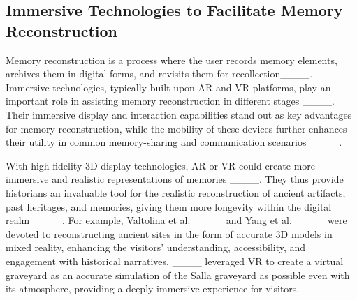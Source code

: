 








\subsection{Immersive Technologies to Facilitate Memory Reconstruction}
Memory reconstruction is a process where the user records memory elements, archives them in digital forms, and revisits them for recollection____. 
Immersive technologies, typically built upon AR and VR platforms, play an important role in assisting memory reconstruction in different stages ____.
Their immersive display and interaction capabilities stand out as key advantages for memory reconstruction, while the mobility of these devices further enhances their utility in common memory-sharing and communication scenarios ____.



With high-fidelity 3D display technologies, AR or VR could create more immersive and realistic representations of memories ____.
They thus provide historians an invaluable tool for the realistic reconstruction of ancient artifacts, past heritages, and memories, giving them more longevity within the digital realm ____.
For example, Valtolina et al. ____ and Yang et al. ____ were devoted to reconstructing ancient sites in the form of accurate 3D models in mixed reality, enhancing the visitors' understanding, accessibility, and engagement with historical narratives.
____ leveraged VR to create a virtual graveyard as an accurate simulation of the Salla graveyard as possible even with its atmosphere, providing a deeply immersive experience for visitors.


